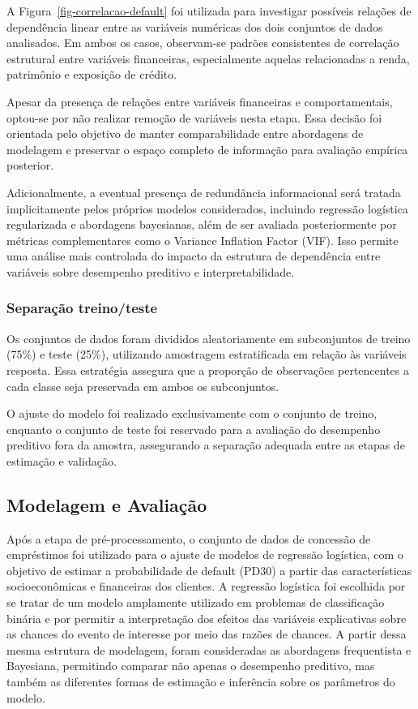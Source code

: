 \documentclass[
  brazilian,
  12pt,
  letterpaper,
  DIV=11,
  numbers=noendperiod]{scrartcl}
\begin{document}
A Figura~\ref{fig-correlacao-default} foi utilizada para investigar
possíveis relações de dependência linear entre as variáveis numéricas
dos dois conjuntos de dados analisados. Em ambos os casos, observam-se
padrões consistentes de correlação estrutural entre variáveis
financeiras, especialmente aquelas relacionadas a renda, patrimônio e
exposição de crédito.

Apesar da presença de relações entre variáveis financeiras e
comportamentais, optou-se por não realizar remoção de variáveis nesta
etapa. Essa decisão foi orientada pelo objetivo de manter
comparabilidade entre abordagens de modelagem e preservar o espaço
completo de informação para avaliação empírica posterior.

Adicionalmente, a eventual presença de redundância informacional será
tratada implicitamente pelos próprios modelos considerados, incluindo
regressão logística regularizada e abordagens bayesianas, além de ser
avaliada posteriormente por métricas complementares como o Variance
Inflation Factor (VIF). Isso permite uma análise mais controlada do
impacto da estrutura de dependência entre variáveis sobre desempenho
preditivo e interpretabilidade.

\subsubsection{Separação
treino/teste}\label{separauxe7uxe3o-treinoteste}

Os conjuntos de dados foram divididos aleatoriamente em subconjuntos de
treino (75\%) e teste (25\%), utilizando amostragem estratificada em
relação às variáveis resposta. Essa estratégia assegura que a proporção
de observações pertencentes a cada classe seja preservada em ambos os
subconjuntos.

O ajuste do modelo foi realizado exclusivamente com o conjunto de
treino, enquanto o conjunto de teste foi reservado para a avaliação do
desempenho preditivo fora da amostra, assegurando a separação adequada
entre as etapas de estimação e validação.

\subsection{Modelagem e Avaliação}\label{modelagem-e-avaliauxe7uxe3o}

Após a etapa de pré-processamento, o conjunto de dados de concessão de
empréstimos foi utilizado para o ajuste de modelos de regressão
logística, com o objetivo de estimar a probabilidade de default (PD30) a
partir das características socioeconômicas e financeiras dos clientes. A
regressão logística foi escolhida por se tratar de um modelo amplamente
utilizado em problemas de classificação binária e por permitir a
interpretação dos efeitos das variáveis explicativas sobre as chances do
evento de interesse por meio das razões de chances. A partir dessa mesma
estrutura de modelagem, foram consideradas as abordagens frequentista e
Bayesiana, permitindo comparar não apenas o desempenho preditivo, mas
também as diferentes formas de estimação e inferência sobre os
parâmetros do modelo.
\end{document}
